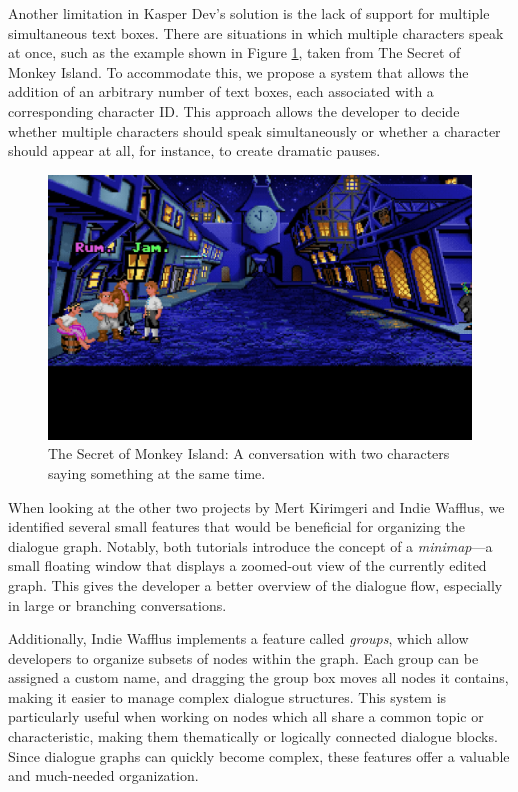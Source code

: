 Another limitation in Kasper Dev's solution is the lack of support for multiple simultaneous text boxes. There are situations in which multiple characters speak at once, such as the example shown in Figure \ref{fig:DialogueConvo}, taken from The Secret of Monkey Island. To accommodate this, we propose a system that allows the addition of an arbitrary number of text boxes, each associated with a corresponding character ID. This approach allows the developer to decide whether multiple characters should speak simultaneously or whether a character should appear at all, for instance, to create dramatic pauses.

\begin{figure}[H]
\centering
\includegraphics[width=.8\linewidth]{img/Dialogue-talking_at_the_same_time.png}
\caption{The Secret of Monkey Island: A conversation with two characters saying something at the same time.}
\label{fig:DialogueConvo}
\end{figure}

When looking at the other two projects by Mert Kirimgeri and Indie Wafflus, we identified several small features that would be beneficial for organizing the dialogue graph. Notably, both tutorials introduce the concept of a \textit{minimap}—a small floating window that displays a zoomed-out view of the currently edited graph. This gives the developer a better overview of the dialogue flow, especially in large or branching conversations. 

Additionally, Indie Wafflus implements a feature called \textit{groups}, which allow developers to organize subsets of nodes within the graph. Each group can be assigned a custom name, and dragging the group box moves all nodes it contains, making it easier to manage complex dialogue structures. This system is particularly useful when working on nodes which all share a common topic or characteristic, making them thematically or logically connected dialogue blocks. Since dialogue graphs can quickly become complex, these features offer a valuable and much-needed organization. 